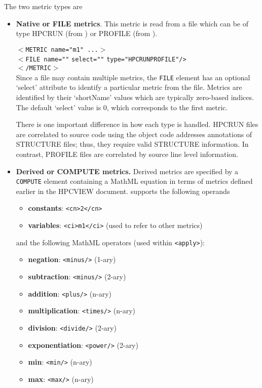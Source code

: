 \documentclass[english]{article}
\begin{document}
\begin{itemize}
The two metric types are
  \begin{itemize}
  \item \textbf{Native or FILE metrics}.  This metric is read from a file which can be of type HPCRUN (from ) or PROFILE (from ).

  \texttt{$<$METRIC name="m1" ...$>$}\\
  \texttt{$<$FILE name="}\texttt{"}
    \texttt{select="}\texttt{"}
    \texttt{type="}\texttt{HPCRUN\Bar PROFILE}\texttt{"/>}\\
  \texttt{$<$/METRIC$>$}\\

   Since a file may contain multiple metrics, the \texttt{FILE} element has an optional `select' attribute to identify a particular metric from the file.  Metrics are identified by their `shortName' values which are typically zero-based indices.  The default `select' value is 0, which corresponds to the first metric.

There is one important difference in how each type is handled.  HPCRUN files are correlated to source code using the object code addresses annotations of STRUCTURE files; thus, they require valid STRUCTURE information.  In contrast, PROFILE files are correlated by source line level information.

  \item \textbf{Derived or COMPUTE metrics.} Derived metrics are specified by a \texttt{COMPUTE} element containing a MathML equation in terms of metrics defined earlier in the HPCVIEW document.   supports the following operands
  \begin{itemize}
    \item \textbf{constants}: \verb+<cn>2</cn>+
    \item \textbf{variables}: \verb+<ci>m1</ci>+ (used to refer to other metrics)
  \end{itemize}
and the following MathML operators (used within \verb+<apply>+):
  \begin{itemize}
    \item \textbf{negation}: \verb+<minus/>+ (1-ary)
    \item \textbf{subtraction}: \verb+<minus/>+ (2-ary)
    \item \textbf{addition}: \verb+<plus/>+ (n-ary)
    \item \textbf{multiplication}: \verb+<times/>+ (n-ary)
    \item \textbf{division}: \verb+<divide/>+ (2-ary)
    \item \textbf{exponentiation}: \verb+<power/>+ (2-ary)
    \item \textbf{min}: \verb+<min/>+ (n-ary)
    \item \textbf{max}: \verb+<max/>+ (n-ary)
  \end{itemize}


\end{itemize}
\end{itemize}
\end{document}
